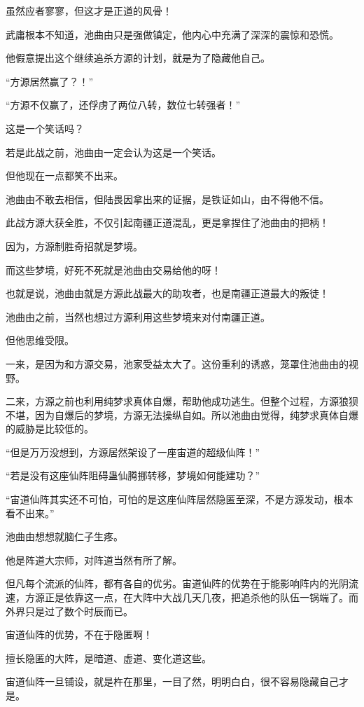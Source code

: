 \begin{this_body}
虽然应者寥寥，但这才是正道的风骨！

武庸根本不知道，池曲由只是强做镇定，他内心中充满了深深的震惊和恐慌。

他假意提出这个继续追杀方源的计划，就是为了隐藏他自己。

“方源居然赢了？！”

“方源不仅赢了，还俘虏了两位八转，数位七转强者！”

这是一个笑话吗？

若是此战之前，池曲由一定会认为这是一个笑话。

但他现在一点都笑不出来。

池曲由不敢去相信，但陆畏因拿出来的证据，是铁证如山，由不得他不信。

此战方源大获全胜，不仅引起南疆正道混乱，更是拿捏住了池曲由的把柄！

因为，方源制胜奇招就是梦境。

而这些梦境，好死不死就是池曲由交易给他的呀！

也就是说，池曲由就是方源此战最大的助攻者，也是南疆正道最大的叛徒！

池曲由之前，当然也想过方源利用这些梦境来对付南疆正道。

但他思维受限。

一来，是因为和方源交易，池家受益太大了。这份重利的诱惑，笼罩住池曲由的视野。

二来，方源之前也利用纯梦求真体自爆，帮助他成功逃生。但整个过程，方源狼狈不堪，因为自爆后的梦境，方源无法操纵自如。所以池曲由觉得，纯梦求真体自爆的威胁是比较低的。

“但是万万没想到，方源居然架设了一座宙道的超级仙阵！”

“若是没有这座仙阵阻碍蛊仙腾挪转移，梦境如何能建功？”

“宙道仙阵其实还不可怕，可怕的是这座仙阵居然隐匿至深，不是方源发动，根本看不出来。”

池曲由想想就脑仁子生疼。

他是阵道大宗师，对阵道当然有所了解。

但凡每个流派的仙阵，都有各自的优劣。宙道仙阵的优势在于能影响阵内的光阴流速，方源正是依靠这一点，在大阵中大战几天几夜，把追杀他的队伍一锅端了。而外界只是过了数个时辰而已。

宙道仙阵的优势，不在于隐匿啊！

擅长隐匿的大阵，是暗道、虚道、变化道这些。

宙道仙阵一旦铺设，就是杵在那里，一目了然，明明白白，很不容易隐藏自己才是。


\end{this_body}
